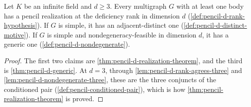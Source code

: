 \begin{corollary}
  \label{cor:pencil-d-conditioned-pair}
  \leanok
  Let $K$ be an infinite field and $d \ge 3$. Every multigraph $G$ with at
  least one body has a pencil realization at the deficiency rank in
  dimension $d$ (\cref{def:pencil-d-rank-hypothesis}). If $G$ is simple,
  it has an adjacent-distinct one (\cref{def:pencil-d-distinct-motive}).
  If $G$ is simple and nondegeneracy-feasible in dimension $d$, it has a
  generic one (\cref{def:pencil-d-nondegenerate}).
\end{corollary}
\begin{proof}
  \leanok
  The first two claims are \cref{thm:pencil-d-realization-theorem}, and
  the third is \cref{thm:pencil-d-generic}. At $d = 3$, through
  \cref{lem:pencil-d-rank-agrees-three} and
  \cref{lem:pencil-d-nondegenerate-three}, these are the three conjuncts
  of the conditioned pair (\cref{def:pencil-conditioned-pair}), which is
  how \cref{thm:pencil-realization-theorem} is proved.
\end{proof}
